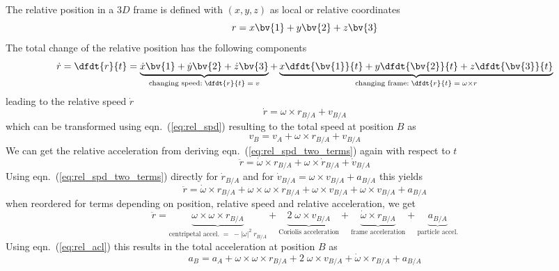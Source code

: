 The relative position in a $3D$ frame is defined with $(x,y,z)$ as local or relative
coordinates
\begin{equation}
    r = x \bv{1} + y \bv{2} + z \bv{3}
\end{equation}
The total change of the relative position has the following components
\begin{equation}
    \dot{r} = \dfdt{r}{t} = \underbrace{\dot{x} \bv{1} + \dot{y} \bv{2} + \dot{z} \bv{3}}
              _{\textrm{changing speed}: \; \dfdt{r}{t} \;=\; v}
            + \underbrace{x \dfdt{\bv{1}}{t} + y \dfdt{\bv{2}}{t} + z \dfdt{\bv{3}}{t}}
              _{\textrm{changing frame}: \; \dfdt{r}{t} \;=\; \omega \times r}
\end{equation}
leading to the relative speed $\dot{r}$
\begin{equation}
    \dot{r} = \omega \times r_{B/A} + v_{B/A}
    \label{eq:rel_spd_two_terms}
\end{equation}
which can be transformed using eqn.~(\ref{eq:rel_spd}) resulting to the total speed at
position $B$ as
\begin{equation}
    v_B = v_A + \omega \times r_{B/A} + v_{B/A} 
\end{equation}
We can get the relative acceleration from deriving eqn.~(\ref{eq:rel_spd_two_terms}) again
with respect to $t$
\begin{equation}
    \ddot{r} = \dot{\omega} \times r_{B/A} + \omega \times \dot{r}_{B/A} + \dot{v}_{B/A}
    \label{eq:rel_acl_three_terms}
\end{equation}
Using eqn.~(\ref{eq:rel_spd_two_terms}) directly for $\dot{r}_{B/A}$ and for
$\dot{v}_{B/A} = \omega \times v_{B/A} + a_{B/A}$ this yields
\begin{equation}
    \ddot{r} = \dot{\omega} \times r_{B/A} + \omega \times \omega \times r_{B/A}
             + \omega \times v_{B/A} + \omega \times v_{B/A} + a_{B/A}
    \label{eq:rel_acl_five_terms}
\end{equation}
when reordered for terms depending on position, relative speed and relative acceleration,
we get
\begin{equation}
    \ddot{r} = \underbrace{\omega \times \omega \times r_{B/A}}_
                          {\textrm{centripetal accel.}
                          \;=\; -|\omega|^2 \; r_{B/A}}
             + \underbrace{2\; \omega \times v_{B/A}}_
                          {\textrm{Coriolis acceleration}}
             + \underbrace{\dot{\omega} \times r_{B/A}}_
                          {\textrm{frame acceleration}}
             + \underbrace{a_{B/A}}_
                          {\textrm{particle accel.}}
    \label{eq:rel_acl_four_terms}
\end{equation}
Using eqn.~(\ref{eq:rel_acl}) this results in the total acceleration at position $B$ as
\begin{equation}
    a_B = a_A + \omega \times \omega \times r_{B/A}
              + 2\; \omega \times v_{B/A}
              + \dot{\omega} \times r_{B/A} + a_{B/A}
\end{equation}

